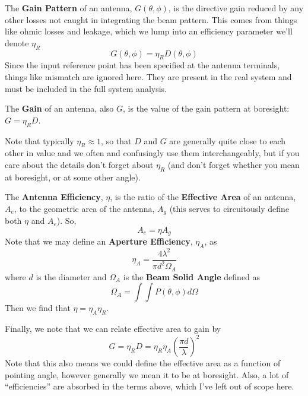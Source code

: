 \documentclass[11pt]{article}
\begin{document}
The {\bf Gain Pattern} of an antenna, $G(\theta,\phi)$, is the directive gain reduced by any other losses not caught in integrating the beam pattern.  This comes from things like ohmic losses and leakage, which we lump into an efficiency parameter we'll denote $\eta_R$
\begin{equation}
G(\theta,\phi) = \eta_R D(\theta,\phi)
\end{equation}
Since the input reference point has been specified at the antenna terminals, things like mismatch are ignored here.  They are present in the real system and must be included in the full system analysis.

The {\bf Gain} of an antenna, also $G$, is the value of the gain pattern at boresight:  $G = \eta_R D$.

Note that typically $\eta_R \approx 1$, so that $D$ and $G$ are generally quite close to each other in value and we often and confusingly use them interchangeably, but if you care about the details don't forget about $\eta_R$ (and don't forget whether you mean at boresight, or at some other angle).

The {\bf Antenna Efficiency}, $\eta$, is the ratio of the  {\bf Effective Area} of an antenna, $A_e$, to the geometric area of the antenna, $A_g$ (this serves to circuitously define both $\eta$ and $A_e$).  So,
\begin{equation}
A_e = \eta A_g
\end{equation}
Note that we may define an {\bf Aperture Efficiency}, $\eta_A$, as
\begin{equation}
\eta_A = \frac{4\lambda^2}{\pi d^2\Omega_A}
\end{equation}
where $d$ is the diameter and $\Omega_A$ is the {\bf Beam Solid Angle} defined as
\begin{equation}
\Omega_A = \int \int P(\theta,\phi)d\Omega
\end{equation}
Then we find that $\eta = \eta_A \eta_R$.

Finally, we note that we can relate effective area to gain by
\begin{equation}
G = \eta_R D = \eta_R \eta_A\left(\frac{\pi d}{\lambda}\right)^2
\end{equation}
Note that this also means we could define the effective area as a function of pointing angle, however generally we mean it to be at boresight.  Also, a lot of ``efficiencies'' are absorbed in the terms above, which I've left out of scope here.
\end{document}

